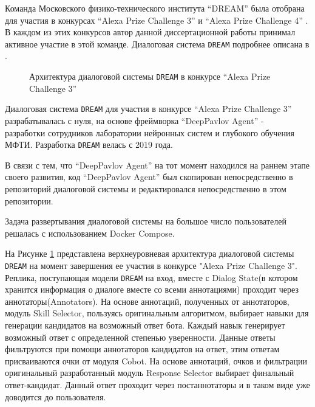 Команда Московского физико-технического института “DREAM” была отобрана для участия в конкурсах “Alexa Prize Challenge 3” \cite{na_website_ndh} и “Alexa Prize Challenge 4” \cite{na_website_ndi}. В каждом из этих конкурсов автор данной диссертационной работы принимал активное участие в этой команде. Диалоговая система \texttt{DREAM} подробнее описана в \cite{dream1}\cite{dream1_trudy}\cite{dream2}.

\begin{figure}[ht]
  \caption{Архитектура диалоговой системы \texttt{DREAM} в конкурсе “Alexa Prize Challenge 3”}\label{fig:Alexa1}
\end{figure}


Диалоговая система \texttt{DREAM} для участия в конкурсе “Alexa Prize Challenge 3” разрабатывалась с нуля, на основе фреймворка “DeepPavlov Agent” -  разработки сотрудников лаборатории нейронных систем и глубокого обучения МФТИ. Разработка \texttt{DREAM} велась с 2019 года.

В связи с тем, что “DeepPavlov Agent” на тот момент находился на раннем этапе своего развития, код “DeepPavlov Agent” был скопирован непосредственно в репозиторий диалоговой системы и редактировался непосредственно в этом репозитории.  

Задача развертывания диалоговой системы на большое число пользователей решалась с использованием Docker Compose. \cite{na_website_ndk}

На Рисунке \ref{fig:Alexa1} представлена верхнеуровневая архитектура диалоговой системы \texttt{DREAM} на момент завершения ее участия в конкурсе "Alexa Prize Challenge 3". Реплика, поступающая модели \texttt{DREAM} на вход, вместе с Dialog State(в котором хранится информация о диалоге вместе со всеми аннотациями) проходит через аннотаторы(Annotators). На основе аннотаций, полученных от аннотаторов, модуль Skill Selector, пользуясь оригинальным алгоритмом, выбирает навыки для генерации кандидатов на возможный ответ бота. Каждый навык генерирует возможный ответ с определенной степенью уверенности. Данные ответы фильтруются при помощи аннотаторов кандидатов на ответ, этим ответам присваиваются очки от модуля Cobot. На основе аннотаций, очков и фильтрации оригинальный разработанный модуль Response Selector выбирает финальный ответ-кандидат. Данный ответ проходит через постаннотаторы и в таком виде уже доводится до пользователя.

